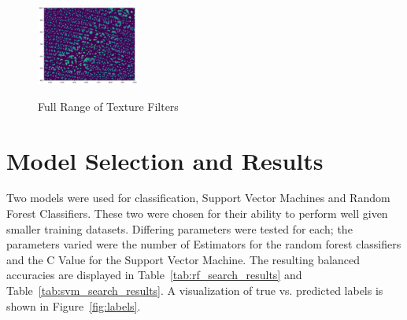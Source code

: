 \documentclass[12pt]{article}
\begin{document}
\begin{figure}[H]
{{{                \includegraphics[width=0.3\textwidth]{zoomed_texture_4_2.png}
            }
        }\hfill{
        }
    }\caption{Full Range of Texture Filters}
    \label{fig:texture}
\end{figure}


\section{Model Selection and Results}

Two models were used for classification, Support Vector Machines and Random Forest Classifiers. 
These two were chosen for their ability to perform well given smaller training datasets. 
Differing parameters were tested for each; the parameters varied were the number of Estimators
for the random forest classifiers and the C Value for the Support Vector Machine. The resulting
balanced accuracies are displayed in Table~\ref{tab:rf_search_results} and 
Table~\ref{tab:svm_search_results}. A visualization of true vs. predicted labels is shown 
in Figure~\ref{fig:labels}.
\end{document}

